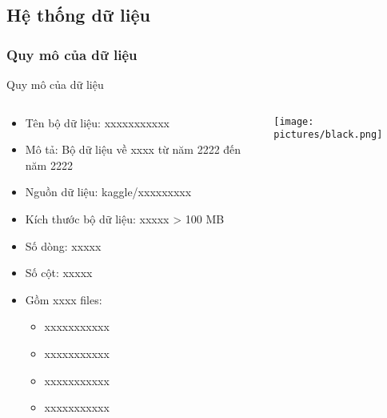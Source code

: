 \subsection{Hệ thống dữ liệu}
\subsubsection{Quy mô của dữ liệu}
\begin{frame}{Quy mô của dữ liệu}
\begin{columns}
\begin{column}{0.4\textwidth}
\begin{itemize}
\item Tên bộ dữ liệu: xxxxxxxxxxx
\item Mô tả: Bộ dữ liệu về xxxx từ năm 2222 đến năm 2222
\item Nguồn dữ liệu: kaggle/xxxxxxxxx
\item Kích thước bộ dữ liệu: xxxxx > 100 MB
\item Số dòng: xxxxx
\item Số cột: xxxxx
\item Gồm xxxx files:
\begin{itemize}
\item xxxxxxxxxxx
\item xxxxxxxxxxx
\item xxxxxxxxxxx
\item xxxxxxxxxxx
\end{itemize}
\end{itemize}
\end{column}
\begin{column}{0.6\textwidth}
\texttt{[image: pictures/black.png]}
\end{column}
\end{columns}
\end{frame}
